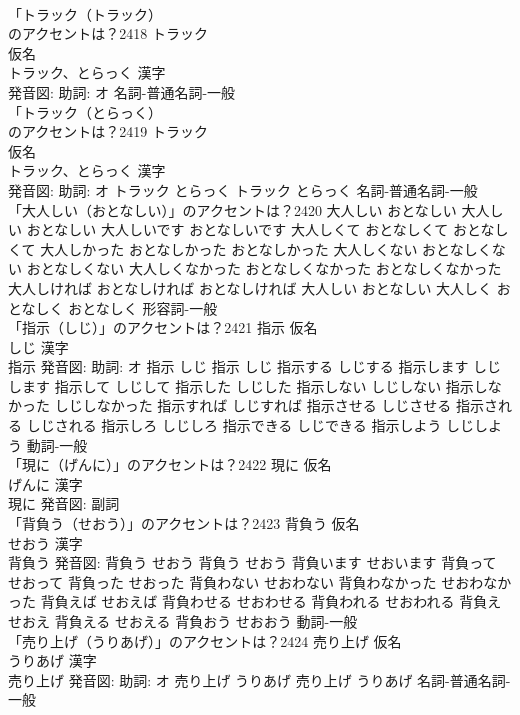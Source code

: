 \documentclass[8pt]{extreport}
\begin{document}
\begin{CJK}{UTF8}{min}
\\	「トラック（トラック）
\\	のアクセントは？2418	トラック
\\	仮名　
\\	トラック、とらっく 漢字　
\\	発音図: 助詞: オ							名詞-普通名詞-一般 
\\	「トラック（とらっく）
\\	のアクセントは？2419	トラック
\\	仮名　
\\	トラック、とらっく 漢字　
\\	発音図: 助詞: オ	トラック とらっく		トラック とらっく				名詞-普通名詞-一般 
\\	「大人しい（おとなしい）」のアクセントは？2420		大人しい おとなしい		大人しい おとなしい 大人しいです おとなしいです 大人しくて おとなしくて おとなしくて 大人しかった おとなしかった おとなしかった 大人しくない おとなしくない おとなしくない 大人しくなかった おとなしくなかった おとなしくなかった 大人しければ おとなしければ おとなしければ 大人しい おとなしい 大人しく おとなしく おとなしく				形容詞-一般 
\\	「指示（しじ）」のアクセントは？2421	指示 仮名　
\\	しじ 漢字　
\\	指示 発音図: 助詞: オ	指示 しじ		指示 しじ 指示する しじする 指示します しじします 指示して しじして 指示した しじした 指示しない しじしない 指示しなかった しじしなかった 指示すれば しじすれば 指示させる しじさせる 指示される しじされる 指示しろ しじしろ 指示できる しじできる 指示しよう しじしよう				動詞-一般 
\\	「現に（げんに）」のアクセントは？2422	現に 仮名　
\\	げんに 漢字　
\\	現に 発音図:							副詞 
\\	「背負う（せおう）」のアクセントは？2423	背負う 仮名　
\\	せおう 漢字　
\\	背負う 発音図:	背負う せおう		背負う せおう 背負います せおいます 背負って せおって 背負った せおった 背負わない せおわない 背負わなかった せおわなかった 背負えば せおえば 背負わせる せおわせる 背負われる せおわれる 背負え せおえ 背負える せおえる 背負おう せおおう				動詞-一般 
\\	「売り上げ（うりあげ）」のアクセントは？2424	売り上げ 仮名　
\\	うりあげ 漢字　
\\	売り上げ 発音図: 助詞: オ	売り上げ うりあげ		売り上げ うりあげ				名詞-普通名詞-一般 

\end{CJK}
\end{document}
